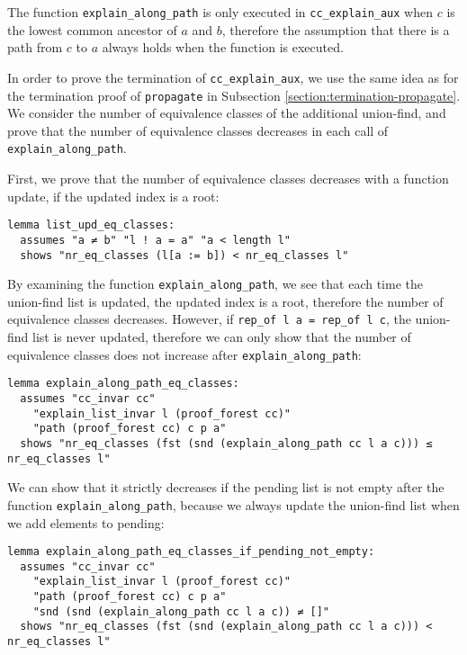 The function \lstinline{explain_along_path} is only executed in \lstinline{cc_explain_aux} when $c$ is the lowest common ancestor of $a$ and $b$, therefore the assumption that there is a path from $c$ to $a$ always holds when the function is executed.

In order to prove the termination of \lstinline{cc_explain_aux}, we use the same idea as for the termination proof of \lstinline{propagate} in Subsection \ref{section:termination-propagate}. We consider the number of equivalence classes of the additional union-find, and prove that the number of equivalence classes decreases in each call of \lstinline{explain_along_path}.

First, we prove that the number of equivalence classes decreases with a function update, if the updated index is a root:

\begin{lstlisting}
lemma list_upd_eq_classes:
  assumes "a ≠ b" "l ! a = a" "a < length l"
  shows "nr_eq_classes (l[a := b]) < nr_eq_classes l"
\end{lstlisting}

By examining the function \lstinline{explain_along_path}, we see that each time the union-find list is updated, the updated index is a root, therefore the number of equivalence classes decreases.
However, if \lstinline{rep_of l a = rep_of l c}, the union-find list is never updated, therefore we can only show that the number of equivalence classes does not increase after \lstinline{explain_along_path}:

\begin{lstlisting}
lemma explain_along_path_eq_classes:
  assumes "cc_invar cc"
    "explain_list_invar l (proof_forest cc)"
    "path (proof_forest cc) c p a"
  shows "nr_eq_classes (fst (snd (explain_along_path cc l a c))) ≤ nr_eq_classes l"
\end{lstlisting}

We can show that it strictly decreases if the pending list is not empty after the function  \lstinline{explain_along_path}, because we always update the union-find list when we add elements to pending:

\begin{lstlisting}
lemma explain_along_path_eq_classes_if_pending_not_empty:
  assumes "cc_invar cc"
    "explain_list_invar l (proof_forest cc)"
    "path (proof_forest cc) c p a"
    "snd (snd (explain_along_path cc l a c)) ≠ []"
  shows "nr_eq_classes (fst (snd (explain_along_path cc l a c))) < nr_eq_classes l"
\end{lstlisting}

